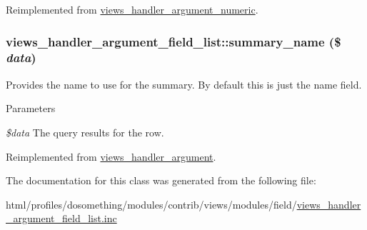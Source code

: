 Reimplemented from \hyperlink{classviews__handler__argument__numeric_ab30359963ec4962258bb8db3b6a870c4}{views\_\-handler\_\-argument\_\-numeric}.\hypertarget{classviews__handler__argument__field__list_acea7796e64251a82b2ad492b836ffbc8}{
\subsubsection[{summary\_\-name}]{\setlength{\rightskip}{0pt plus 5cm}views\_\-handler\_\-argument\_\-field\_\-list::summary\_\-name (\$ {\em data})}}
\label{classviews__handler__argument__field__list_acea7796e64251a82b2ad492b836ffbc8}
Provides the name to use for the summary. By default this is just the name field.


\begin{DoxyParams}{Parameters}
\item[{\em \$data}]The query results for the row. \end{DoxyParams}


Reimplemented from \hyperlink{classviews__handler__argument_a4c55a340453eed4d35c69f7ac790cac1}{views\_\-handler\_\-argument}.

The documentation for this class was generated from the following file:\begin{DoxyCompactItemize}
\item 
html/profiles/dosomething/modules/contrib/views/modules/field/\hyperlink{views__handler__argument__field__list_8inc}{views\_\-handler\_\-argument\_\-field\_\-list.inc}\end{DoxyCompactItemize}
